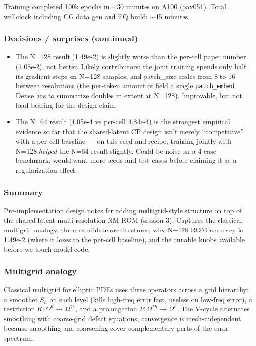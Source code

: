 Training completed 100k epochs in $\sim$30 minutes on A100 (pax051).
Total wallclock including CG data gen and EQ build: $\sim$45 minutes.

\subsubsection*{Decisions / surprises (continued)}
\begin{itemize}
  \item The N=128 result (1.49e-2) is slightly worse than the per-cell paper
        number (1.08e-2), not better. Likely contributors: the joint training
        spends only half its gradient steps on N=128 samples, and patch\_size
        scales from 8 to 16 between resolutions (the per-token amount of field
        a single \texttt{patch\_embed} Dense has to summarize doubles in extent
        at N=128). Improvable, but not load-bearing for the design claim.
  \item The N=64 result (4.05e-4 vs per-cell 4.84e-4) is the strongest
        empirical evidence so far that the shared-latent CP design isn't
        merely ``competitive'' with a per-cell baseline --- on this seed and
        recipe, training jointly with N=128 \emph{helped} the N=64 result
        slightly. Could be noise on a 4-case benchmark; would want more seeds
        and test cases before claiming it as a regularization effect.
\end{itemize}



\subsubsection*{Summary}
Pre-implementation design notes for adding multigrid-style structure on top
of the shared-latent multi-resolution NM-ROM (session 3). Captures the
classical multigrid analogy, three candidate architectures, why N=128 ROM
accuracy is 1.49e-2 (where it loses to the per-cell baseline), and the
tunable knobs available before we touch model code.

\subsubsection*{Multigrid analogy}
Classical multigrid for elliptic PDEs uses three operators across a grid
hierarchy: a smoother $S_h$ on each level (kills high-freq error fast,
useless on low-freq error), a restriction $R: \Omega^h \to \Omega^{2h}$,
and a prolongation $P: \Omega^{2h} \to \Omega^h$. The V-cycle alternates
smoothing with coarse-grid defect equations; convergence is mesh-independent
because smoothing and coarsening cover complementary parts of the error
spectrum.

